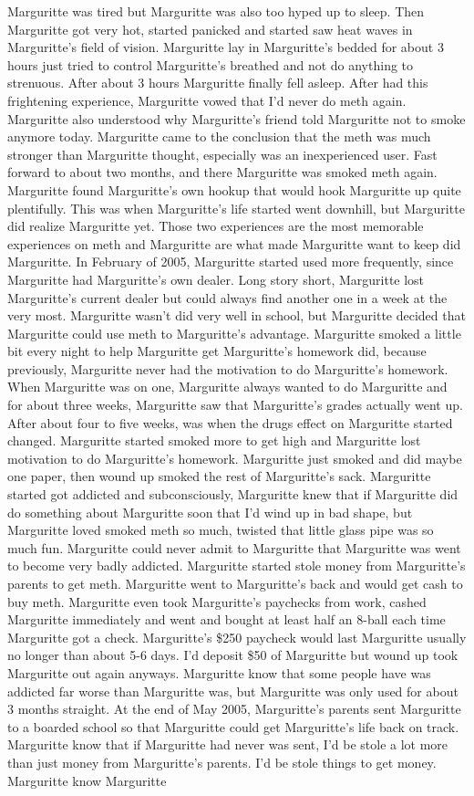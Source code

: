 \documentclass[12pt]{book}
\begin{document}
Marguritte was tired but Marguritte was also too hyped up to sleep. Then Marguritte got very hot, started panicked and started saw heat waves in Marguritte's field of vision. Marguritte lay in Marguritte's bedded for about 3 hours just tried to control Marguritte's breathed and not do anything to strenuous. After about 3 hours Marguritte finally fell asleep. After had this frightening experience, Marguritte vowed that I'd never do meth again. Marguritte also understood why Marguritte's friend told Marguritte not to smoke anymore today. Marguritte came to the conclusion that the meth was much stronger than Marguritte thought, especially was an inexperienced user. Fast forward to about two months, and there Marguritte was smoked meth again. Marguritte found Marguritte's own hookup that would hook Marguritte up quite plentifully. This was when Marguritte's life started went downhill, but Marguritte did realize Marguritte yet. Those two experiences are the most memorable experiences on meth and Marguritte are what made Marguritte want to keep did Marguritte. In February of 2005, Marguritte started used more frequently, since Marguritte had Marguritte's own dealer. Long story short, Marguritte lost Marguritte's current dealer but could always find another one in a week at the very most. Marguritte wasn't did very well in school, but Marguritte decided that Marguritte could use meth to Marguritte's advantage. Marguritte smoked a little bit every night to help Marguritte get Marguritte's homework did, because previously, Marguritte never had the motivation to do Marguritte's homework. When Marguritte was on one, Marguritte always wanted to do Marguritte and for about three weeks, Marguritte saw that Marguritte's grades actually went up. After about four to five weeks, was when the drugs effect on Marguritte started changed. Marguritte started smoked more to get high and Marguritte lost motivation to do Marguritte's homework. Marguritte just smoked and did maybe one paper, then wound up smoked the rest of Marguritte's sack. Marguritte started got addicted and subconsciously, Marguritte knew that if Marguritte did do something about Marguritte soon that I'd wind up in bad shape, but Marguritte loved smoked meth so much, twisted that little glass pipe was so much fun. Marguritte could never admit to Marguritte that Marguritte was went to become very badly addicted. Marguritte started stole money from Marguritte's parents to get meth. Marguritte went to Marguritte's back and would get cash to buy meth. Marguritte even took Marguritte's paychecks from work, cashed Marguritte immediately and went and bought at least half an 8-ball each time Marguritte got a check. Marguritte's \$250 paycheck would last Marguritte usually no longer than about 5-6 days. I'd deposit \$50 of Marguritte but wound up took Marguritte out again anyways. Marguritte know that some people have was addicted far worse than Marguritte was, but Marguritte was only used for about 3 months straight. At the end of May 2005, Marguritte's parents sent Marguritte to a boarded school so that Marguritte could get Marguritte's life back on track. Marguritte know that if Marguritte had never was sent, I'd be stole a lot more than just money from Marguritte's parents. I'd be stole things to get money. Marguritte know Marguritte 
\end{document}
